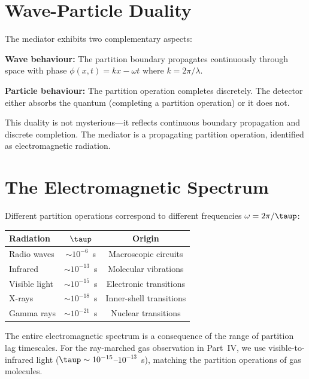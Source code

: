 \section{Wave-Particle Duality}
\label{sec:duality}

The mediator exhibits two complementary aspects:

\textbf{Wave behaviour:} The partition boundary propagates continuously through space with phase $\phi(x,t) = kx - \omega t$ where $k = 2\pi/\lambda$.

\textbf{Particle behaviour:} The partition operation completes discretely. The detector either absorbs the quantum (completing a partition operation) or it does not.

This duality is not mysterious---it reflects continuous boundary propagation and discrete completion. The mediator is a propagating partition operation, identified as electromagnetic radiation.

\section{The Electromagnetic Spectrum}
\label{sec:spectrum}

Different partition operations correspond to different frequencies $\omega = 2\pi/\taup$:
\begin{center}
\begin{tabular}{lcc}
\toprule
\textbf{Radiation} & $\taup$ & \textbf{Origin} \\
\midrule
Radio waves    & $\sim 10^{-6}$~s  & Macroscopic circuits \\
Infrared       & $\sim 10^{-13}$~s & Molecular vibrations \\
Visible light  & $\sim 10^{-15}$~s & Electronic transitions \\
X-rays         & $\sim 10^{-18}$~s & Inner-shell transitions \\
Gamma rays     & $\sim 10^{-21}$~s & Nuclear transitions \\
\bottomrule
\end{tabular}
\end{center}

The entire electromagnetic spectrum is a consequence of the range of partition lag timescales. For the ray-marched gas observation in Part~IV, we use visible-to-infrared light ($\taup \sim 10^{-15}$--$10^{-13}$~s), matching the partition operations of gas molecules.


